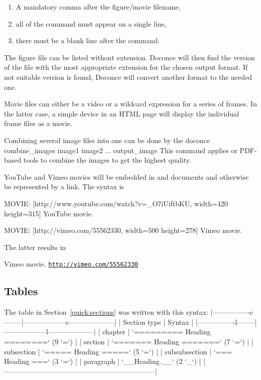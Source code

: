 \documentclass[%
oneside,                 %
final,                   %
10pt]{article}
\begin{document}
\begin{enumerate}
 \item A mandatory comma after the figure/movie filename,

 \item all of the command must appear on a single line,

 \item there must be a blank line after the command.
\end{enumerate}

\noindent
The figure file can be listed without extension. Doconce will then find
the version of the file with the most appropriate extension for the chosen
output format. If not suitable version is found, Doconce will convert
another format to the needed one.

Movie files can either be a video or a wildcard expression for a
series of frames. In the latter case, a simple device in an HTML page
will display the individual frame files as a movie.

Combining several image files into one can be done by the
\bsys
doconce combine_images image1 image2 ... output_image
\esys
This command applies  or PDF-based tools to combine the images
to get the highest quality.

YouTube and Vimeo movies will be embedded in  and  documents
and otherwise be represented by a link. The syntax is

\bccq
MOVIE: [http://www.youtube.com/watch?v=_O7iUiftbKU, width=420 height=315] YouTube movie.

MOVIE: [http://vimeo.com/55562330, width=500 height=278] Vimeo movie.

\eccq
The latter results in

 Vimeo movie. \href{{http://vimeo.com/55562330}}{\nolinkurl{http://vimeo.com/55562330}}


\subsection{Tables}

The table in Section~\ref{quick:sections} was written with this
syntax:
\bccq
|----------------c--------|------------------c--------------------|
|      Section type       |        Syntax                         |
|----------------l--------|------------------l--------------------|
| chapter                 | `========= Heading ========` (9 `=`)  |
| section                 | `======= Heading =======`    (7 `=`)  |
| subsection              | `===== Heading =====`        (5 `=`)  |
| subsubsection           | `=== Heading ===`            (3 `=`)  |
| paragraph               | `__Heading.__`               (2 `_`)  |
|-----------------------------------------------------------------|
\eccq
\end{document}
